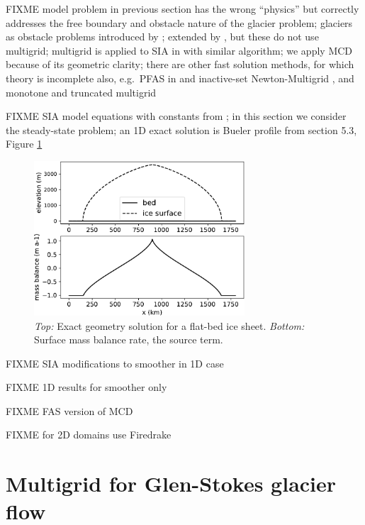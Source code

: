 \documentclass[letterpaper,final,12pt,reqno]{amsart}
\theoremstyle{claim}
\numberwithin{equation}{section}
\numberwithin{figure}{section}
\numberwithin{table}{section}
\numberwithin{theorem}{section}
\begin{document}
FIXME model problem in previous section has the wrong ``physics'' but correctly addresses the free boundary and obstacle nature of the glacier problem; glaciers as obstacle problems introduced by \cite{Calvoetal2002}; extended by \cite{Bueler2016,Bueler2020,JouvetBueler2012}, but these do not use multigrid; multigrid is applied to SIA in \cite{Jouvetetal2013,JouvetGraeser2013} with similar algorithm; we apply MCD because of its geometric clarity; there are other fast solution methods, for which theory is incomplete also, e.g.~PFAS in \cite{BrandtCryer1983} and inactive-set Newton-Multigrid \cite[Chapter 12]{Bueler2021}, and monotone and truncated multigrid \cite{GraeserKornhuber2009}

FIXME SIA model equations \cite{Bueler2016} with constants from \cite{Huybrechtsetal1996}; in this section we consider the steady-state problem; an 1D exact solution is Bueler profile from \cite{vanderVeen2013} section 5.3, Figure \ref{fig:siadatafigure}

\begin{figure}
\includegraphics[width=0.7\textwidth]{fixfigs/siadatafigure.pdf}
\caption{\emph{Top:} Exact geometry solution for a flat-bed ice sheet.  \emph{Bottom:} Surface mass balance rate, the source term.}
\label{fig:siadatafigure}
\end{figure}

FIXME SIA modifications to smoother in 1D case

FIXME 1D results for smoother only

FIXME FAS version of MCD

FIXME for 2D domains use Firedrake


\section{Multigrid for Glen-Stokes glacier flow} \label{sec:stokes}
\end{document}
